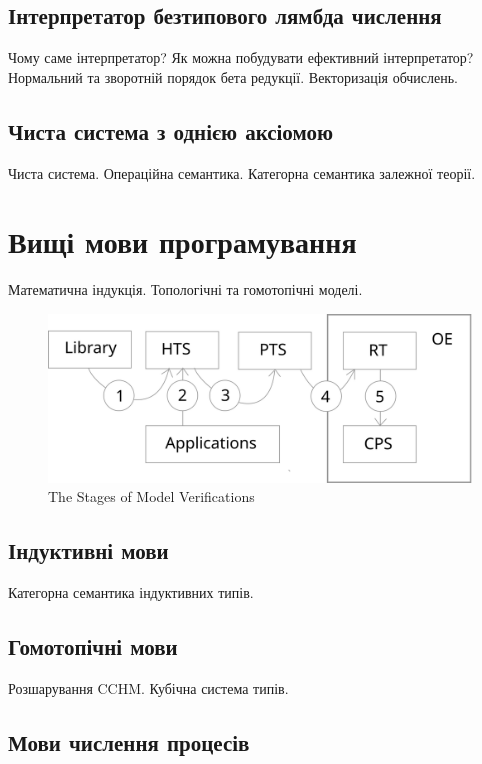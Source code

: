 \documentclass{article}
\begin{document}
\subsection{Інтерпретатор безтипового лямбда числення}

Чому саме інтерпретатор?
Як можна побудувати ефективний інтерпретатор?
Нормальний та зворотній порядок бета редукції.
Векторизація обчислень.

\subsection{Чиста система з однією аксіомою}

Чиста система.
Операційна семантика.
Категорна семантика залежної теорії.

\section{Вищі мови програмування}

Математична індукція.
Топологічні та гомотопічні моделі.

\begin{figure}[h]
  \centerline{\includegraphics[scale=0.28]{higher}}
  \caption{The Stages of Model Verifications}
\end{figure}

\subsection{Індуктивні мови}

Категорна семантика індуктивних типів.

\subsection{Гомотопічні мови}

Розшарування CCHM.
Кубічна система типів.

\subsection{Мови числення процесів}
\end{document}
